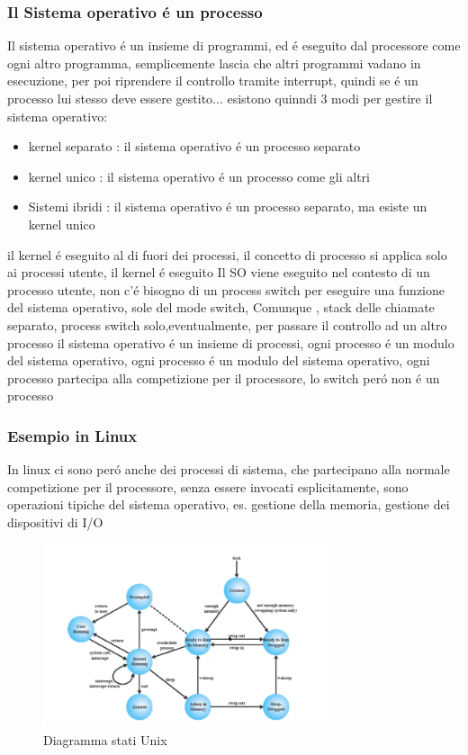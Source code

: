 \subsubsection{Il Sistema operativo é un processo}
Il sistema operativo é un insieme di programmi, ed é eseguito dal processore come ogni altro programma, semplicemente
lascia che altri programmi vadano in esecuzione, per poi riprendere il controllo tramite interrupt, quindi se é un processo lui stesso
deve essere gestito...
esistono quinndi 3 modi per gestire il sistema operativo:
\begin{itemize}
    \item kernel separato : il sistema operativo é un processo separato
    \item kernel unico : il sistema operativo é un processo come gli altri
    \item Sistemi ibridi : il sistema operativo é un processo separato, ma esiste un kernel unico
\end{itemize}
il kernel é eseguito al di fuori dei processi, il concetto di processo si applica solo ai processi utente, il kernel é eseguito
Il SO viene eseguito nel contesto di un processo utente, non c'é bisogno di un process switch per eseguire una funzione del sistema operativo,
sole del mode switch, Comunque , stack delle chiamate separato, process switch solo,eventualmente, per passare il controllo ad un altro processo
il sistema operativo é un insieme di processi, ogni processo é un modulo del sistema operativo, ogni processo é un modulo del sistema operativo,
ogni processo partecipa alla competizione per il processore, lo switch peró non é un processo
\subsubsection{Esempio in Linux}
In linux ci sono peró anche dei processi di sistema, che partecipano alla normale competizione per il processore, senza essere invocati esplicitamente,
sono operazioni tipiche del sistema operativo, es. gestione della memoria, gestione dei dispositivi di I/O
\begin{figure}
    \centering
    \includegraphics[width=0.75\textwidth]{immagini/transizioneTraStatiDeiProcessi}
    \caption{Diagramma stati Unix}
\end{figure}
